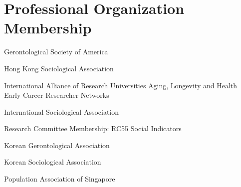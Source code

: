 \section{Professional Organization Membership}




\begin{aka}[noitemsep]

    \item []  Gerontological Society of America

    \item [] Hong Kong Sociological Association

    \item [] International Alliance of Research Universities Aging, Longevity and Health Early Career Researcher Networks

    \item [] International Sociological Association
        \begin{akb}
        \item Research Committee Membership: RC55 Social Indicators
    \end{akb}
    \item [] Korean Gerontological Association
    \item [] Korean Sociological Association

    \item [] Population Association of Singapore


\end{aka}
